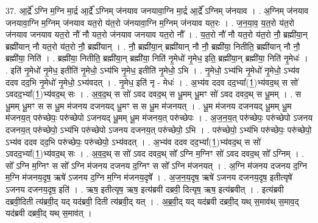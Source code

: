 \documentclass[17pt]{extarticle}
\begin{document}
37. आ॒र्द्रे᳚ ऽग्नि म॒ग्नि मा॒र्द्र आ॒र्द्रे᳚ ऽग्निम् ज॑नयाव जनयावा॒ग्नि मा॒र्द्र आ॒र्द्रे᳚ ऽग्निम् ज॑नयाव । . अ॒ग्निम् ज॑नयाव जनयावा॒ग्नि म॒ग्निम् ज॑नयाव यत॒रो य॑त॒रो ज॑नयावा॒ग्नि म॒ग्निम् ज॑नयाव यत॒रः । . ज॒न॒या॒व॒ य॒त॒रो य॑त॒रो ज॑नयाव जनयाव यत॒रो नौ॑ नौ यत॒रो ज॑नयाव जनयाव यत॒रो नौ᳚ । . य॒त॒रो नौ॑ नौ यत॒रो य॑त॒रो नौ॒ ब्रह्मी॑या॒न् ब्रह्मी॑यान् नौ यत॒रो य॑त॒रो नौ॒ ब्रह्मी॑यान् । . नौ॒ ब्रह्मी॑या॒न् ब्रह्मी॑यान् नौ नौ॒ ब्रह्मी॑या॒ नितीति॒ ब्रह्मी॑यान् नौ नौ॒ ब्रह्मी॑या॒ निति॑ । . ब्रह्मी॑या॒ नितीति॒ ब्रह्मी॑या॒न् ब्रह्मी॑या॒ निति॑ नृ॒मेधो॑ नृ॒मेध॒ इति॒ ब्रह्मी॑या॒न् ब्रह्मी॑या॒ निति॑ नृ॒मेधः॑ । . इति॑ नृ॒मेधो॑ नृ॒मेध॒ इतीति॑ नृ॒मेधो॒ ऽभ्य॑भि नृ॒मेध॒ इतीति॑ नृ॒मेधो॒ ऽभि । . नृ॒मेधो॒ ऽभ्य॑भि नृ॒मेधो॑ नृ॒मेधो॒ ऽभ्य॑व ददव दद॒भि नृ॒मेधो॑ नृ॒मेधो॒ ऽभ्य॑वदत् । . नृ॒मेध॒ इति॑ नृ - मेधः॑ । . अ॒भ्य॑व ददव दद॒भ्या᳚(1॒)भ्य॑वद॒थ् स सो॑ ऽवदद॒भ्या᳚(1॒)भ्य॑वद॒थ् सः । . अ॒व॒द॒थ् स सो॑ ऽवद दवद॒थ् स धू॒मम् धू॒मꣳ सो॑ ऽवद दवद॒थ् स धू॒मम् । . स धू॒मम् धू॒मꣳ स स धू॒म म॑जनय दजनयद् धू॒मꣳ स स धू॒म म॑जनयत् । . धू॒म म॑जनय दजनयद् धू॒मम् धू॒म म॑जनय॒त् परु॑च्छेपः॒ परु॑च्छेपो ऽजनयद् धू॒मम् धू॒म म॑जनय॒त् परु॑च्छेपः । . अ॒ज॒न॒य॒त् परु॑च्छेपः॒ परु॑च्छेपो ऽजनय दजनय॒त् परु॑च्छेपो॒ ऽभ्य॑भि परु॑च्छेपो ऽजनय दजनय॒त् परु॑च्छेपो॒ ऽभि । . परु॑च्छेपो॒ ऽभ्य॑भि परु॑च्छेपः॒ परु॑च्छेपो॒ ऽभ्य॑व ददव दद॒भि परु॑च्छेपः॒ परु॑च्छेपो॒ ऽभ्य॑वदत् । . अ॒भ्य॑व ददव दद॒भ्या᳚(1॒)भ्य॑वद॒थ् स सो॑ ऽवदद॒भ्या᳚(1॒)भ्य॑वद॒थ् सः । . अ॒व॒द॒थ् स सो॑ ऽवद दवद॒थ् सो᳚ ऽग्नि म॒ग्निꣳ सो॑ ऽवद दवद॒थ् सो᳚ ऽग्निम् । . सो᳚ ऽग्नि म॒ग्निꣳ स सो᳚ ऽग्नि म॑जनय दजनय द॒ग्निꣳ स सो᳚ ऽग्नि म॑जनयत् । . अ॒ग्नि म॑जनय दजनय द॒ग्नि म॒ग्नि म॑जनय॒दृष॒ ऋषे॑ ऽजनय द॒ग्नि म॒ग्नि म॑जनय॒दृषे᳚ । . अ॒ज॒न॒य॒दृष॒ ऋषे॑ ऽजनय दजनय॒दृष॒ इतीत्यृषे॑ ऽजनय दजनय॒दृष॒ इति॑ । . ऋष॒ इतीत्यृष॒ ऋष॒ इत्य॑ब्रवी दब्रवी॒ दित्यृष॒ ऋष॒ इत्य॑ब्रवीत् । . इत्य॑ब्रवी दब्रवी॒दिती त्य॑ब्रवी॒द् यद् यद॑ब्रवी॒ दिती त्य॑ब्रवी॒द् यत् । . अ॒ब्र॒वी॒द् यद् यद॑ब्रवी दब्रवी॒द् यथ् स॒माव॑थ् स॒माव॒द् यद॑ब्रवी दब्रवी॒द् यथ् स॒माव॑त् । \newline
\pagebreak
{}
\end{document}
